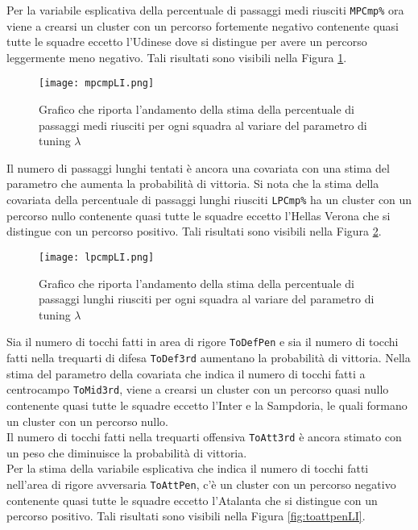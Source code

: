Per la variabile esplicativa della percentuale di passaggi medi riusciti \texttt{MPCmp\%} ora viene a crearsi un cluster con un percorso fortemente negativo contenente quasi tutte le squadre eccetto l'Udinese dove si distingue per avere un percorso leggermente meno negativo. Tali risultati sono visibili nella Figura \ref{fig:mpcmpLI}.\\
\begin{figure}[]
	\begin{center}
		\texttt{[image: mpcmpLI.png]}
		\caption{Grafico che riporta l'andamento della stima della percentuale di passaggi medi riusciti per ogni squadra al variare del parametro di tuning $\lambda$} \label{fig:mpcmpLI}
	\end{center}
\end{figure}
Il numero di passaggi lunghi tentati è ancora una covariata con una stima del parametro che aumenta la probabilità di vittoria. Si nota che la stima della covariata della percentuale di passaggi lunghi riusciti \texttt{LPCmp\%} ha un cluster con un percorso nullo contenente quasi tutte le squadre eccetto l'Hellas Verona che si distingue con un percorso positivo. Tali risultati sono visibili nella Figura \ref{fig:lpcmpLI}.\\
\begin{figure}[htbp]
	\begin{center}
		\texttt{[image: lpcmpLI.png]}
		\caption{Grafico che riporta l'andamento della stima della percentuale di passaggi lunghi riusciti per ogni squadra al variare del parametro di tuning $\lambda$} \label{fig:lpcmpLI}
	\end{center}
\end{figure}
Sia il numero di tocchi fatti in area di rigore \texttt{ToDefPen} e sia il numero di tocchi fatti nella trequarti di difesa \texttt{ToDef3rd} aumentano la probabilità di vittoria. Nella stima del parametro della covariata che indica il numero di tocchi fatti a centrocampo \texttt{ToMid3rd}, viene a crearsi un cluster con un percorso quasi nullo contenente quasi tutte le squadre eccetto l'Inter e la Sampdoria, le quali formano un cluster con un percorso nullo.\\
Il numero di tocchi fatti nella trequarti offensiva \texttt{ToAtt3rd} è ancora stimato con un peso che diminuisce la probabilità di vittoria.\\
Per la stima della variabile esplicativa che indica il numero di tocchi fatti nell'area di rigore avversaria \texttt{ToAttPen}, c'è un cluster con un percorso negativo contenente quasi tutte le squadre eccetto l'Atalanta che si distingue con un percorso positivo. Tali risultati sono visibili nella Figura \ref{fig:toattpenLI}.\\
